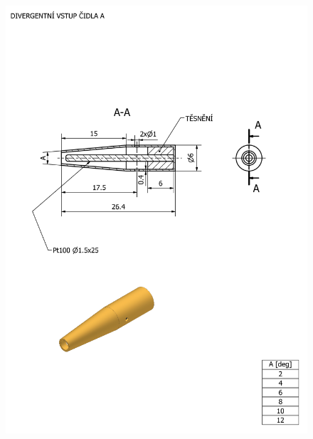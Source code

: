     \begin{figure}[ht!]
        \centering
        \includegraphics[width=\textwidth]{400_SIMULACE_KONSTRUKCNICH_UPRAV/Vykresy_rendery/Difuzor_A_vykres.png}
        
    \end{figure}
    \newpage
{} \label{fig:kavita-A-vykres}

